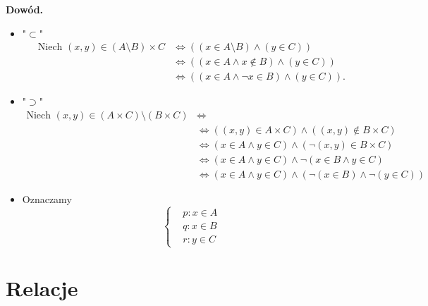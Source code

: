 \documentclass[a5paper,8pt]{article}
\theoremstyle{mythmstyle}
\begin{document}
            \textbf{Dowód.}
            \begin{itemize}
                \item "$ \subset $"
                    \begin{align*}
                        \text{Niech  } (x, y) \in (A \setminus B) \times C &\iff 
                        ((x \in A \setminus B) \wedge (y \in C)) \\
                        &\iff ((x \in A \wedge x \notin B) \wedge (y \in C)) \\
                        &\iff ((x \in A \wedge \neg x \in B) \wedge (y \in C)).
                    \end{align*}

                \item "$ \supset $"
                    \begin{align*}
                        \text{Niech  } (x, y) \in (A \times C) \setminus (B \times C) &\iff \\
                        &\iff((x, y) \in A \times C) \wedge ((x, y) \notin B \times C) \\
                        &\iff(x \in A \wedge y \in C) \wedge (\neg (x, y) \in B \times C)  \\
                        &\iff(x \in A \wedge y \in C) \wedge \neg(x \in B \wedge y \in C)  \\
                        &\iff(x \in A \wedge y \in C) \wedge (\neg(x \in B) \wedge \neg(y \in C))
                    \end{align*}

                \item Oznaczamy
                    \begin{equation*}
                      \begin{cases}
                        &p: x \in A \\
                        &q : x \in B \\
                        &r : y \in C
                      \end{cases}
                    \end{equation*}
            \end{itemize}

        \pagebreak
        \section{Relacje} %
        \label{sec:relacje}
        
\end{document}
